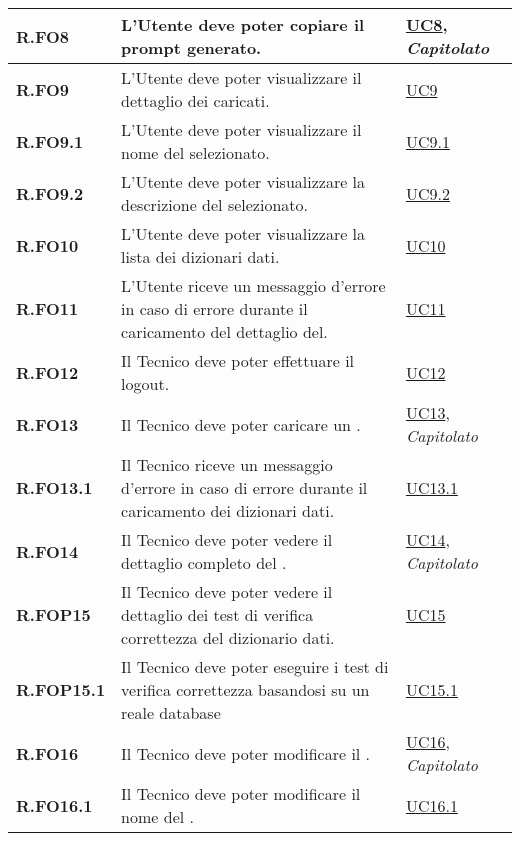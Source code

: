 \begin{longtable}{|P{3cm}|P{6,5cm}|>{\arraybackslash}P{4cm}|}
    \hline
    \textbf{R.FO8} & L’Utente  deve poter copiare il prompt generato. &  \hyperref[UC8]{UC8}, \emph{Capitolato}\\
    \hline
    \textbf{R.FO9} & L’Utente  deve poter visualizzare il dettaglio dei  caricati. &  \hyperref[UC9]{UC9}\\
    \hline
    \textbf{R.FO9.1} & L’Utente  deve poter visualizzare il nome del  selezionato. &  \hyperref[UC9point1]{UC9.1}\\
    \hline
    \textbf{R.FO9.2} & L’Utente  deve poter visualizzare la descrizione del  selezionato. &  \hyperref[UC9point2]{UC9.2}\\
    \hline
    \textbf{R.FO10} & L’Utente  deve poter visualizzare la lista dei dizionari dati. &  \hyperref[UC10]{UC10}\\
    \hline
    \textbf{R.FO11} & L’Utente  riceve un messaggio d'errore in caso di errore durante il caricamento del dettaglio del. &  \hyperref[UC11]{UC11}\\
    \hline
    \textbf{R.FO12} & Il Tecnico deve poter effettuare il logout. &  \hyperref[UC12]{UC12}\\
    \hline
    \textbf{R.FO13} & Il Tecnico deve poter caricare un . &  \hyperref[UC13]{UC13}, \emph{Capitolato}\\
    \hline
    \textbf{R.FO13.1} & Il Tecnico riceve un messaggio d'errore in caso di errore durante il caricamento dei dizionari dati. &  \hyperref[UC13point1]{UC13.1}\\
    \hline
    \textbf{R.FO14} & Il Tecnico deve poter vedere il dettaglio completo del . &  \hyperref[UC14]{UC14}, \emph{Capitolato}\\
    \hline
    \textbf{R.FOP15} & Il Tecnico deve poter vedere il dettaglio dei test di verifica correttezza del dizionario dati. &  \hyperref[UC15]{UC15}\\
    \hline
    \textbf{R.FOP15.1} & Il Tecnico deve poter eseguire i test di verifica correttezza basandosi su un reale database &  \hyperref[UC15point1]{UC15.1}\\
    \hline
    \textbf{R.FO16} & Il Tecnico deve poter modificare il . &  \hyperref[UC16]{UC16}, \emph{Capitolato}\\
    \hline
    \textbf{R.FO16.1} & Il Tecnico deve poter modificare il nome del . &  \hyperref[UC16point1]{UC16.1}\\

\end{longtable}
